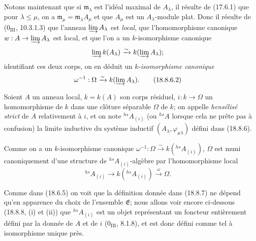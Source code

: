 \begin{env}[18.8.6]
Notons maintenant que si $\mathfrak m_\lambda$ est l'idéal maximal de $A_\lambda$, il résulte de (17.6.1) que pour $\lambda\leq\mu$, on a $\mathfrak m_\mu=\mathfrak m_\lambda A_\mu$ et que $A_\mu$ est un $A_\lambda$-module plat. Donc il résulte de ($0_{\mathrm{III}}$, 10.3.1.3) que l'anneau $\varinjlim A_\lambda$ est \emph{local}, que l'homomorphisme canonique $w:A\to\varinjlim A_\lambda$ est local, et que l'on a un $k$-isomorphisme canonique
\[
  \varinjlim k(A_\lambda)\xrightarrow{\sim}k(\varinjlim A_\lambda);
\]
identifiant ces deux corps, on en déduit un $k$-\emph{isomorphisme canonique}
\begin{equation}
  \omega^{-1}:\Omega\xrightarrow{\sim}k(\varinjlim A_\lambda).
  \label{IV.18.8.6.2}
  \tag{18.8.6.2}
\end{equation}
\end{env}

\begin{definition}[18.8.7]
Soient $A$ un anneau local, $k=k(A)$ son corps résiduel, $i:k\to\Omega$ un homomorphisme de $k$ dans une clôture séparable $\Omega$ de $k$; on appelle \emph{hensélisé strict} de $A$ relativement à $i$, et on note ${}^{hs}\!A_{(i)}$ (ou ${}^{hs}\!A$ lorsque cela ne prête pas à confusion) la limite inductive du système inductif $(A_\lambda,\varphi_{\mu\lambda})$ défini dans (18.8.6).
\end{definition}

Comme on a un $k$-isomorphisme canonique $\omega^{-1}:\Omega\xrightarrow{\sim}k({}^{hs}\!A_{(i)})$, $\Omega$ est muni canoniquement d'une structure de ${}^{hs}\!A_{(i)}$-algèbre par l'homomorphisme local
\[
  {}^{hs}\!A_{(i)}\longrightarrow k({}^{hs}\!A_{(i)})\xrightarrow{\omega}\Omega.
\]

Comme dans (18.6.5) on voit que la définition donnée dans (18.8.7) ne dépend qu'en apparence du choix de l'ensemble $\mathfrak E$; nous allons voir encore ci-dessous (18.8.8, (i) et (ii)) que ${}^{hs}\!A_{(i)}$ est un objet représentant un foncteur entièrement défini par la donnée de $A$ et de $i$ ($0_{\mathrm{III}}$, 8.1.8), et est donc défini comme tel à isomorphisme unique près.

